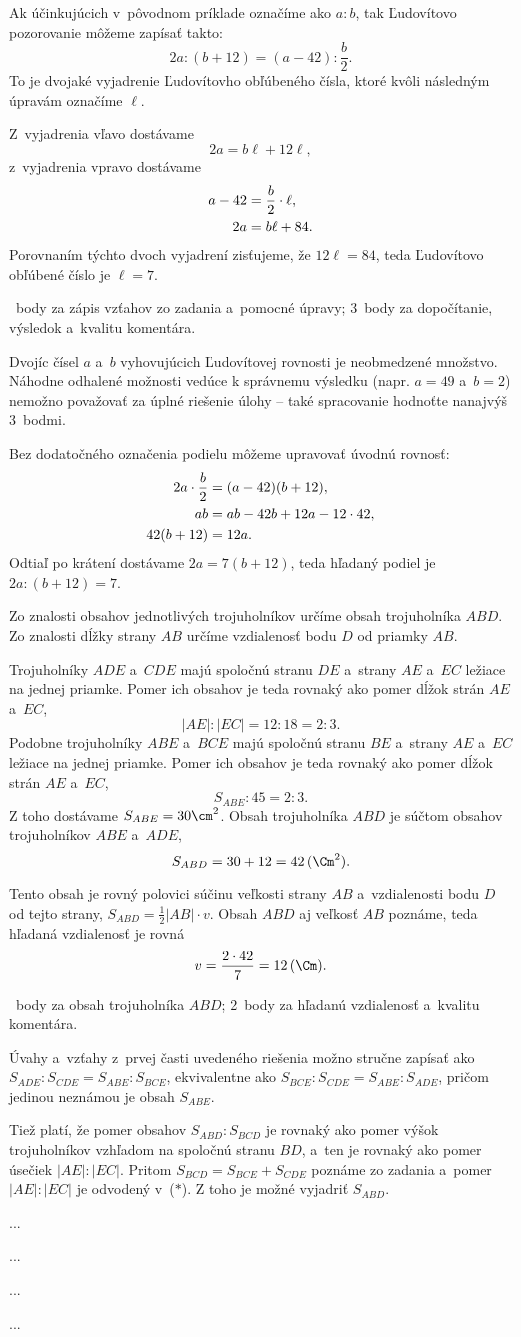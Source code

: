{%
Ak účinkujúcich v~pôvodnom príklade označíme ako $a:b$, tak Ľudovítovo pozorovanie môžeme zapísať takto:
$$
2a:(b+12)=(a-42):\frac{b}2.
$$
To je dvojaké vyjadrenie Ľudovítovho obľúbeného čísla, ktoré kvôli následným úpravám označíme $\ell$.

Z~vyjadrenia vľavo dostávame
$$
2a=b \ell+12\ell,
$$
z~vyjadrenia vpravo dostávame
$$\aligned
a-42 &=\frac{b}2\cdot\ell, \\
2a &=b\ell +84.
\endaligned
$$
Porovnaním týchto dvoch vyjadrení zisťujeme, že $12\ell=84$, teda Ľudovítovo obľúbené číslo je $\ell=7$.

~body za zápis vzťahov zo zadania a~pomocné úpravy;
3~body za dopočítanie, výsledok a~kvalitu komentára.

\poznamky
Dvojíc čísel $a$ a~$b$ vyhovujúcich Ľudovítovej rovnosti je neobmedzené množstvo.
Náhodne odhalené možnosti vedúce k správnemu výsledku (napr. $a=49$ a~$b=2$) nemožno považovať za úplné riešenie úlohy -- také spracovanie hodnoťte nanajvýš 3~bodmi.

Bez dodatočného označenia podielu môžeme upravovať úvodnú rovnosť:
$$\aligned
2a\cdot\frac{b}2 &=(a-42)(b+12), \\
ab &=ab-42b+12a-12\cdot42, \\
42(b+12) &=12a.
\endaligned
$$
Odtiaľ po krátení dostávame $2a=7(b+12)$, teda hľadaný podiel je $2a:(b+12)=7$.
\endhodnotenie}

{%
Zo znalosti obsahov jednotlivých trojuholníkov určíme obsah trojuholníka $ABD$.
Zo znalosti dĺžky strany $AB$ určíme vzdialenosť bodu $D$ od priamky $AB$.
%

Trojuholníky $ADE$ a~$CDE$ majú spoločnú stranu $DE$ a~strany $AE$ a~$EC$ ležiace na jednej priamke.
Pomer ich obsahov je teda rovnaký ako pomer dĺžok strán $AE$ a~$EC$,
$$
|AE|:|EC| =12:18 =2:3. \tag{$*$}
$$
Podobne trojuholníky $ABE$ a~$BCE$ majú spoločnú stranu $BE$ a~strany $AE$ a~$EC$ ležiace na jednej priamke.
Pomer ich obsahov je teda rovnaký ako pomer dĺžok strán $AE$ a~$EC$,
$$
S_{ABE}:45 =2:3.
$$
Z toho dostávame $S_{ABE}=30\cm^2$.
Obsah trojuholníka $ABD$ je súčtom obsahov trojuholníkov $ABE$ a~$ADE$,
$$
S_{ABD}=30+12 =42\,(\Cm^2).
$$

Tento obsah je rovný polovici súčinu veľkosti strany $AB$ a~vzdialenosti bodu $D$ od tejto strany,
$S_{ABD}=\frac12|AB|\cdot v$.
Obsah $ABD$ aj veľkosť $AB$ poznáme, teda hľadaná vzdialenosť je rovná
$$
v=\frac{2\cdot42}{7}=12\,(\Cm).
$$

~body za obsah trojuholníka $ABD$;
2~body za hľadanú vzdialenosť a~kvalitu komentára.

\poznamky
Úvahy a~vzťahy z~prvej časti uvedeného riešenia možno stručne zapísať ako
$S_{ADE}:S_{CDE} =S_{ABE}:S_{BCE}$,
ekvivalentne ako
$S_{BCE}:S_{CDE} =S_{ABE}:S_{ADE}$,
pričom jedinou neznámou je obsah $S_{ABE}$.

Tiež platí, že pomer obsahov $S_{ABD}:S_{BCD}$ je rovnaký ako pomer výšok trojuholníkov vzhľadom na spoločnú stranu $BD$, a~ten je rovnaký ako pomer úsečiek $|AE|:|EC|$.
Pritom $S_{BCD}=S_{BCE}+S_{CDE}$ poznáme zo zadania a~pomer $|AE|:|EC|$ je odvodený v~($*$).
Z toho je možné vyjadriť $S_{ABD}$.
\endhodnotenie}

{%
...}

{%
...}

{%
...}

{%
...}

